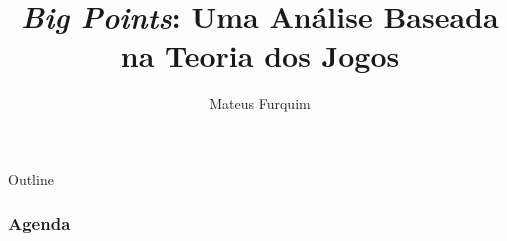 \documentclass[12pt]{beamer}
\title{\emph{Big Points}: Uma Análise Baseada na Teoria dos Jogos}
\author{Mateus Furquim}
\institute{Engenharia de Software\\ Universidade de Brasília}
\begin{document}
\frame{\titlepage \vspace{-0.5cm}
}
\begin{frame}[allowframebreaks]{Outline}
	\frametitle{Agenda}
	\tableofcontents%
\end{frame}





%
%


\end{document}
